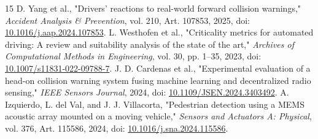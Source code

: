 \documentclass[conference]{IEEEtran}
\begin{document}
\begin{thebibliography}{15}
 D. Yang et al., "Drivers' reactions to real-world forward collision warnings," \emph{Accident Analysis \& Prevention}, vol. 210, Art. 107853, 2025, doi: \url{10.1016/j.aap.2024.107853}.
 L. Westhofen et al., "Criticality metrics for automated driving: A review and suitability analysis of the state of the art," \emph{Archives of Computational Methods in Engineering}, vol. 30, pp. 1--35, 2023, doi: \url{10.1007/s11831-022-09788-7}.
 J. D. Cardenas et al., "Experimental evaluation of a head-on collision warning system fusing machine learning and decentralized radio sensing," \emph{IEEE Sensors Journal}, 2024, doi: \url{10.1109/JSEN.2024.3403492}.
 A. Izquierdo, L. del Val, and J. J. Villacorta, "Pedestrian detection using a MEMS acoustic array mounted on a moving vehicle," \emph{Sensors and Actuators A: Physical}, vol. 376, Art. 115586, 2024, doi: \url{10.1016/j.sna.2024.115586}.
\end{thebibliography}
\end{document}
